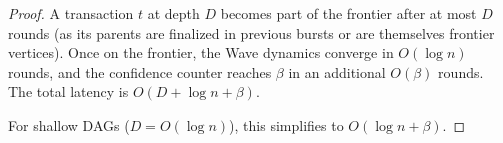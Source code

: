 \begin{proof}
A transaction $t$ at depth $D$ becomes part of the frontier after at most $D$ rounds
(as its parents are finalized in previous bursts or are themselves frontier vertices).
Once on the frontier, the Wave dynamics converge in $O(\log n)$ rounds, and the
confidence counter reaches $\beta$ in an additional $O(\beta)$ rounds. The total
latency is $O(D + \log n + \beta)$.

For shallow DAGs ($D = O(\log n)$), this simplifies to $O(\log n + \beta)$.
\end{proof}

